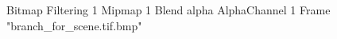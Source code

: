 {Bitmap
	{Filtering 1}
	{Mipmap 1}
	{Blend alpha}
	{AlphaChannel 1}
	{Frame "branch_for_scene.tif.bmp"}
}
